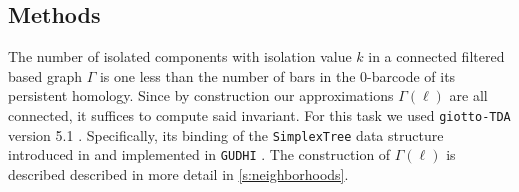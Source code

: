 \subsection{Methods}

The number of isolated components with isolation value $k$ in a connected filtered based graph $\Gamma$ is one less than the number of bars in the 0-barcode of its persistent homology.
Since by construction our approximations $\Gamma(\ell)$ are all connected, it suffices to compute said invariant.
For this task we used \texttt{giotto-TDA} version 5.1 \cite{tauzin2021giotto}.
Specifically, its binding of the \texttt{SimplexTree} data structure introduced in \cite{boissonnat2014simplex} and implemented in \texttt{GUDHI} \cite{maria2014gudhi}.
The construction of $\Gamma(\ell)$ is described described in more detail in \cref{s:neighborhoods}. 